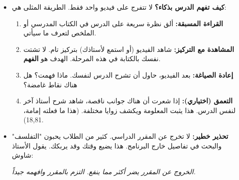\documentclass[12pt,a4paper]{book}
\newcommand{\quoteAr}[1]{%
	\begin{myquote}
		\itshape #1
	\end{myquote}
}
\begin{document}
\begin{itemize}
         \quoteAr{اختر مصدراً واحداً أو اثنين فقط. كلما كثّرتَ المصادر تشتّتتَ ولم تعرف ماذا تختار. تعلّم تحل وحدك التمارين حتى تصبح يدك خفيفة. قدر ما حللتَ من تمارين، قدر ما تزداد فرصة صادفة نفس الأفكار في الامتحان.}
		\item \textbf{كيف تفهم الدرس بذكاء؟} لا تتفرج على فيديو واحد فقط. الطريقة المثلى هي:
		\begin{enumerate}
			\item \textbf{القراءة المسبقة:} ألق نظرة سريعة على الدرس في الكتاب المدرسي أو الملخص لتعرف ما سيأتي.
			\item \textbf{المشاهدة مع التركيز:} شاهد الفيديو (أو استمع لأستاذك) بتركيز تام. لا تشتت نفسك بالكتابة في هذه المرحلة. الهدف هو \textbf{الفهم}.
			\item \textbf{إعادة الصياغة:} بعد الفيديو، حاول أن تشرح الدرس لنفسك. ماذا فهمت؟ هل هناك نقاط غامضة؟
			\item \textbf{التعمق (اختياري):} إذا شعرت أن هناك جوانب ناقصة، شاهد شرح أستاذ آخر لنفس الدرس. هذا يثبت المعلومة ويكشف زوايا مختلفة. (هذا ما فعلته إمامة، 18,81).
		\end{enumerate}
		\item \textbf{تحذير خطير:} لا تخرج عن المقرر الدراسي. كثير من الطلاب يحبون "التفلسف" والبحث في تفاصيل خارج البرنامج. هذا يضيع وقتك وقد يربكك. يقول الأستاذ شاوش: \quoteAr{الخروج عن المقرر يضر أكثر مما ينفع. التزم بالمقرر وافهمه جيداً.}
	\end{itemize}
	
\end{document}
